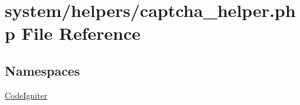 \hypertarget{captcha__helper_8php}{}\section{system/helpers/captcha\+\_\+helper.php File Reference}
\label{captcha__helper_8php}
\subsection*{Namespaces}
\begin{DoxyCompactItemize}
\item 
 \mbox{\hyperlink{namespace_code_igniter}{Code\+Igniter}}
\end{DoxyCompactItemize}
